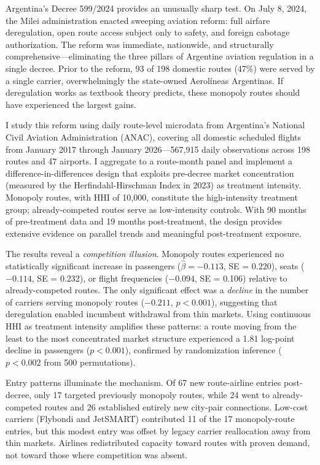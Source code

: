 \documentclass[12pt]{article}
\begin{document}
Argentina's Decree 599/2024 provides an unusually sharp test. On July 8, 2024, the Milei administration enacted sweeping aviation reform: full airfare deregulation, open route access subject only to safety, and foreign cabotage authorization. The reform was immediate, nationwide, and structurally comprehensive---eliminating the three pillars of Argentine aviation regulation in a single decree. Prior to the reform, 93 of 198 domestic routes (47\%) were served by a single carrier, overwhelmingly the state-owned Aerol\'{i}neas Argentinas. If deregulation works as textbook theory predicts, these monopoly routes should have experienced the largest gains.

I study this reform using daily route-level microdata from Argentina's National Civil Aviation Administration (ANAC), covering all domestic scheduled flights from January 2017 through January 2026---567,915 daily observations across 198 routes and 47 airports. I aggregate to a route-month panel and implement a difference-in-differences design that exploits pre-decree market concentration (measured by the Herfindahl-Hirschman Index in 2023) as treatment intensity. Monopoly routes, with HHI of 10,000, constitute the high-intensity treatment group; already-competed routes serve as low-intensity controls. With 90 months of pre-treatment data and 19 months post-treatment, the design provides extensive evidence on parallel trends and meaningful post-treatment exposure.

The results reveal a \textit{competition illusion}. Monopoly routes experienced no statistically significant increase in passengers ($\hat{\beta} = -0.113$, SE = 0.220), seats ($-0.114$, SE = 0.232), or flight frequencies ($-0.094$, SE = 0.106) relative to already-competed routes. The only significant effect was a \textit{decline} in the number of carriers serving monopoly routes ($-0.211$, $p < 0.001$), suggesting that deregulation enabled incumbent withdrawal from thin markets. Using continuous HHI as treatment intensity amplifies these patterns: a route moving from the least to the most concentrated market structure experienced a 1.81 log-point decline in passengers ($p < 0.001$), confirmed by randomization inference ($p < 0.002$ from 500 permutations).

Entry patterns illuminate the mechanism. Of 67 new route-airline entries post-decree, only 17 targeted previously monopoly routes, while 24 went to already-competed routes and 26 established entirely new city-pair connections. Low-cost carriers (Flybondi and JetSMART) contributed 11 of the 17 monopoly-route entries, but this modest entry was offset by legacy carrier reallocation away from thin markets. Airlines redistributed capacity toward routes with proven demand, not toward those where competition was absent.
\end{document}
